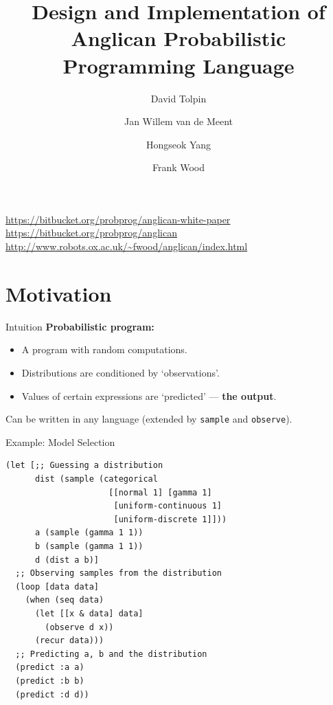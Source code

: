 \documentclass{beamer}
\title{Design and Implementation of\\Anglican Probabilistic Programming Language}
\author{David Tolpin \and Jan Willem van de Meent \and Hongseok Yang \and Frank Wood}
\begin{document}
\begin{frame}
\titlepage
\vfill
\center
\url{https://bitbucket.org/probprog/anglican-white-paper}\\
\url{https://bitbucket.org/probprog/anglican} \\
\url{http://www.robots.ox.ac.uk/~fwood/anglican/index.html}

\end{frame}

\section{Motivation}

\begin{frame}{Intuition}
    \textbf{Probabilistic program:}
\begin{itemize}
\item A program with random computations.
\item Distributions are conditioned by `observations'.
\item Values of certain expressions are `predicted' --- \textbf{the output}.
\end{itemize}

Can be written in any language (extended by \texttt{sample} and \texttt{observe}).
\end{frame}

\begin{frame}[fragile]{Example: Model Selection}
\begin{verbatim}
(let [;; Guessing a distribution
      dist (sample (categorical
                     [[normal 1] [gamma 1]
                      [uniform-continuous 1]
                      [uniform-discrete 1]]))
      a (sample (gamma 1 1))
      b (sample (gamma 1 1))
      d (dist a b)]
  ;; Observing samples from the distribution
  (loop [data data]
    (when (seq data)
      (let [[x & data] data]
        (observe d x))
      (recur data)))
  ;; Predicting a, b and the distribution
  (predict :a a) 
  (predict :b b)
  (predict :d d))
\end{verbatim}
\end{frame}
\end{document}
